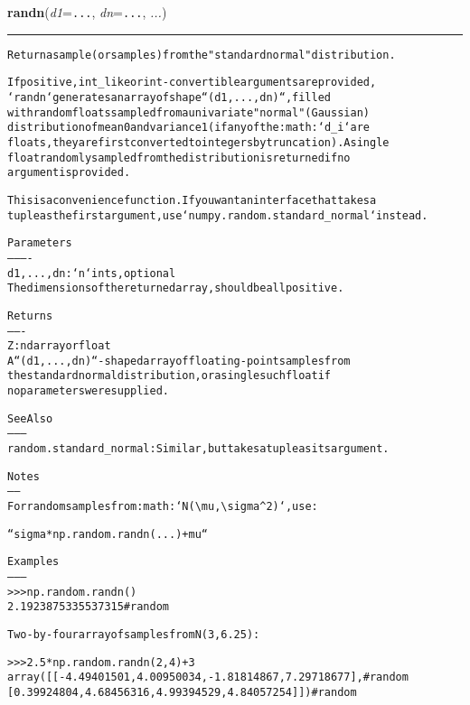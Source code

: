     \label{QSTK:qstklearn:mldiagnostics:randn}

    \vspace{0.5ex}

\hspace{.8\funcindent}\begin{boxedminipage}{\funcwidth}

    \raggedright \textbf{randn}(\textit{d1}={\tt ...}, \textit{dn}={\tt ...}, \textit{...})

    \vspace{-1.5ex}

    \rule{\textwidth}{0.5\fboxrule}
\setlength{\parskip}{2ex}
\begin{alltt}
Return a sample (or samples) from the "standard normal" distribution.

If positive, int\_like or int-convertible arguments are provided,
`randn` generates an array of shape ``(d1, ..., dn)``, filled
with random floats sampled from a univariate "normal" (Gaussian)
distribution of mean 0 and variance 1 (if any of the :math:`d\_i` are
floats, they are first converted to integers by truncation). A single
float randomly sampled from the distribution is returned if no
argument is provided.

This is a convenience function.  If you want an interface that takes a
tuple as the first argument, use `numpy.random.standard\_normal` instead.

Parameters
----------
d1, ..., dn : `n` ints, optional
    The dimensions of the returned array, should be all positive.

Returns
-------
Z : ndarray or float
    A ``(d1, ..., dn)``-shaped array of floating-point samples from
    the standard normal distribution, or a single such float if
    no parameters were supplied.

See Also
--------
random.standard\_normal : Similar, but takes a tuple as its argument.

Notes
-----
For random samples from :math:`N({\textbackslash}mu, {\textbackslash}sigma{\textasciicircum}2)`, use:

``sigma * np.random.randn(...) + mu``

Examples
--------
{\textgreater}{\textgreater}{\textgreater} np.random.randn()
2.1923875335537315 \#random

Two-by-four array of samples from N(3, 6.25):

{\textgreater}{\textgreater}{\textgreater} 2.5 * np.random.randn(2, 4) + 3
array([[-4.49401501,  4.00950034, -1.81814867,  7.29718677],  \#random
       [ 0.39924804,  4.68456316,  4.99394529,  4.84057254]]) \#random
\end{alltt}

\setlength{\parskip}{1ex}
    \end{boxedminipage}

